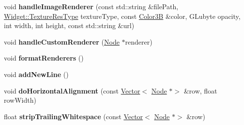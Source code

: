 \begin{DoxyCompactItemize}
\item 
\mbox{\label{classui_1_1RichText_ad4889520c45f8e196f1a30b674a2c0aa}} 
void {\bfseries handle\+Image\+Renderer} (const std\+::string \&file\+Path, \hyperlink{classui_1_1Widget_a040a65ec5ad3b11119b7e16b98bd9af0}{Widget\+::\+Texture\+Res\+Type} texture\+Type, const \hyperlink{structColor3B}{Color3B} \&color, G\+Lubyte opacity, int width, int height, const std\+::string \&url)
\item 
\mbox{\label{classui_1_1RichText_a403610d2ba44e45be8337e077d8e4920}} 
void {\bfseries handle\+Custom\+Renderer} (\hyperlink{classNode}{Node} $\ast$renderer)
\item 
\mbox{\label{classui_1_1RichText_ae1db37a688dc94ef2100635aab5ebdc1}} 
void {\bfseries format\+Renderers} ()
\item 
\mbox{\label{classui_1_1RichText_abefb9a51c377fc8a5934e8dd245c446e}} 
void {\bfseries add\+New\+Line} ()
\item 
\mbox{\label{classui_1_1RichText_ad9bf19319cf7f8fc6ddafee46f2d2860}} 
void {\bfseries do\+Horizontal\+Alignment} (const \hyperlink{classVector}{Vector}$<$ \hyperlink{classNode}{Node} $\ast$$>$ \&row, float row\+Width)
\item 
\mbox{\label{classui_1_1RichText_a9a09b062644958c82b8fb9338bdfc20d}} 
float {\bfseries strip\+Trailing\+Whitespace} (const \hyperlink{classVector}{Vector}$<$ \hyperlink{classNode}{Node} $\ast$$>$ \&row)
\end{DoxyCompactItemize}
